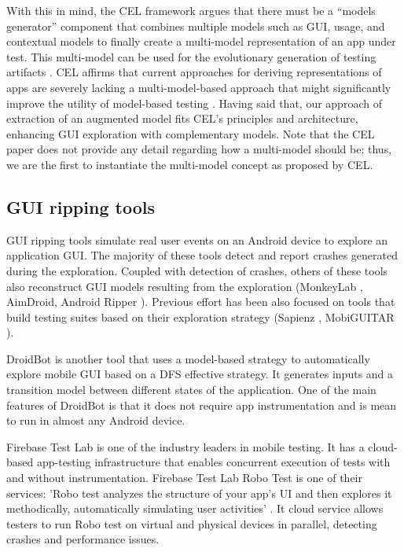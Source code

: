 With this in mind, the CEL framework argues that there must be a ``models generator'' component that combines multiple models such as GUI, usage, and contextual models to finally create a multi-model representation of an app under test. This multi-model can be used for the evolutionary generation of testing artifacts \cite{linares-vasquez_moran_poshyvanyk_2017}. CEL affirms that current approaches for deriving  representations of apps are severely lacking a multi-model-based approach that might significantly improve the utility of model-based testing \cite{linares-vasquez_moran_poshyvanyk_2017}. Having said that, our approach of extraction of an augmented model fits CEL's principles and architecture, enhancing GUI exploration with complementary models. Note that the CEL paper does not provide any detail regarding how a multi-model should be; thus, we are the first to instantiate the multi-model concept as proposed by CEL.

\subsection{GUI ripping tools}
\label{native:ripping}
GUI ripping tools  simulate real user events on an Android device to explore an application GUI. The majority of these tools detect and report crashes generated during the exploration. Coupled with detection of crashes, others of these tools also reconstruct GUI models resulting from the exploration (\eg MonkeyLab \cite{monkeylab}, AimDroid\cite{aimDroid}, Android Ripper \cite{amalfitano_fasolino_tramontana_carmine_memon_2012}). Previous effort has been also focused on tools that build testing suites based on their exploration strategy (\eg Sapienz \cite{mao_harman_jia_2016}, MobiGUITAR \cite{amalfitano_fasolino_tramontana_ta_memon_2015}).

DroidBot\cite{Li:ICSE17} is another tool that uses a model-based strategy to automatically explore mobile GUI based on a DFS effective strategy. It generates inputs and a transition model between different states of the application. One of the main features of DroidBot is that it does not require app instrumentation and is mean to run in almost any Android device.

Firebase Test Lab \cite{firebase} is one of the industry leaders in mobile testing. It has a cloud-based app-testing infrastructure that enables concurrent execution of tests with and without instrumentation. Firebase Test Lab Robo Test is one of their services: 'Robo test analyzes the structure of your app's UI and then explores it methodically, automatically simulating user activities' \cite{firebase}. It cloud service allows testers to run Robo test on virtual and physical devices in parallel, detecting crashes and performance issues. 

